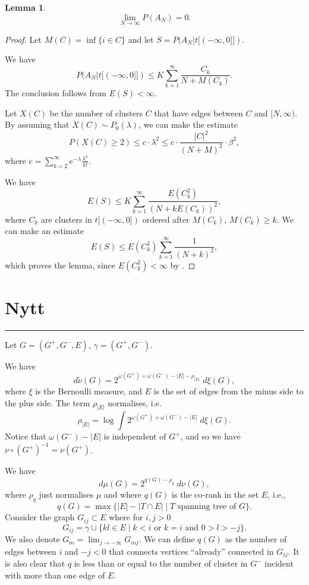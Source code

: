 \documentclass[11pt, a4paper, oneside]{scrartcl}
\newtheorem{lem}[thm]{Lemma}
\theoremstyle{definition}
\theoremstyle{remark}
\providecommand{\tl}{\tilde}
\begin{document}
\begin{lem}
$$\lim_{N\to \infty} P(A_N)=0.$$
\end{lem}

\begin{proof}
  Let $M(C)=\inf \{i\in C \}$ and let $S=P(A_N |t[(-\infty, 0]])$.

  We have
$$P(A_N|t[(-\infty, 0]])\leq K \sum_{k=1}^\infty \frac{C_k}{N+M(C_k)}.$$
The conclusion follows from $E(S)<\infty$.

Let $X(C)$ be the number of clusters $C$ that have edges between $C$ and
$[N,\infty)$. By assuming that $X(C)\sim P_0(\lambda)$, we can make the estimate
$$P(X(C)\geq 2)\leq c\cdot \lambda^2 \leq c\cdot \frac{|C|^2}{(N+M)^2}\cdot \beta^2,$$
where $c=\sum_{k=2}^\infty e^{-\lambda} \frac{\lambda^k}{k!}$.

We have
$$E(S) \leq K \sum_{k=1}^\infty \frac{E(C_k^2)}{(N+k E(C_k))^2},$$
where $C_k$ are clusters in $t[(-\infty, 0])$ ordered after $M(C_k)$,
$M(C_k)\geq k$. We can make an estimate
$$E(S)\leq E(C_k^2)\sum _{k=1}^\infty \frac{1}{(N+k)^2},$$
which proves the lemma, since $E(C_k^2)<\infty$ by
\cite{aizenmanUniquenessInfiniteCluster1987}.

\end{proof}





\section{Nytt}
\hrule 

Let $G=(G^+, G^- , E)$, $\gamma=(G^+,G^-)$.

We have
$$d\tl\nu(G)=2^{\omega(G^+)+\omega(G^-)-|E|-\rho_{|E|}}\; d\xi(G),$$
where $\xi$ is the Bernoulli measure, and $E$ is the set of edges from the minus side to the plus side. The term $\rho_{|E|}$ normalises, i.e.\
\[
\rho_{|E|} = 
\log \int 2^{\omega(G^+)+\omega(G^-)-|E|}\; d\xi(G).
\]
Notice that
$\omega(G^-)-|E|$ is independent of $G^+$, and so we have $\nu\circ (G^+)^{-1}=\nu(G^+)$.

We have 
$$d\mu(G)=2^{q(G)-\rho_q}\; d\nu(G),$$
where $\rho_q$ just normalises $\mu$ and where $q(G)$ is the co-rank in the set $E$, i.e., 
$$
q(G)=\max \{|E|-|T\cap E|\mid \text{$T$ spanning tree of $G$} \}.
$$
Consider the graph $G_{ij}\subset E$ where for $i,j>0$
$$ G_{ij} =  \gamma \cup 
\{ kl\in E \mid k < i \text{ or } k=i \text{ and } 0>l>-j \}.
$$
We also denote $G_m = \lim_{j\to-\infty} G_{mj}$. 
We can define $q(G)$ as the number of edges between $i$ and $-j<0$ that connects vertices ``already'' connected in $G_{ij}$. 
It is also clear that $q$ is less than or equal to the number of 
cluster in $G^-$ incident with more than one edge of $E$.
\end{document}
